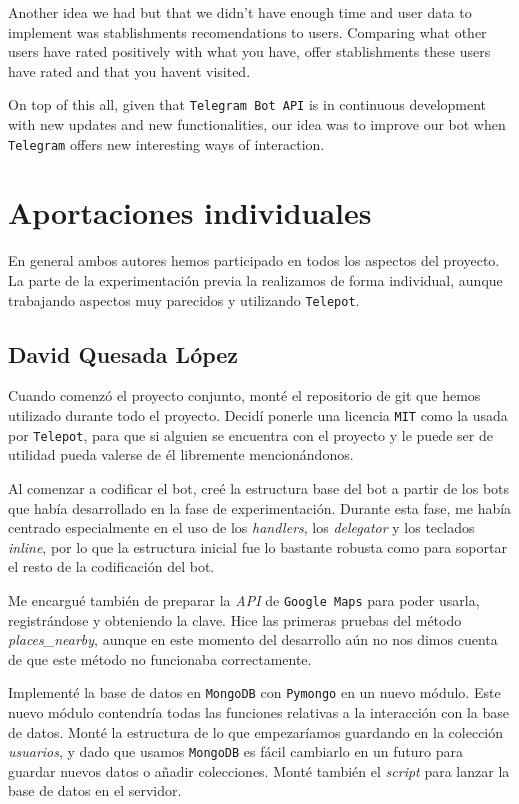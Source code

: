 \documentclass[oneside]{memoir}
\newcommand{\mychapter}[2]{
    \setcounter{chapter}{#1}
    \setcounter{section}{0}
    \chapter*{#2}
    \addcontentsline{toc}{chapter}{#2}
}
\begin{document}
Another idea we had but that we didn't have enough time and user data to implement was stablishments recomendations to users. Comparing what other users have rated positively with what you have, offer stablishments these users have rated and that you havent visited.

On top of this all, given that \texttt{Telegram Bot API} is in continuous development with new updates and new functionalities, our idea was to improve our bot when \texttt{Telegram} offers new interesting ways of interaction.

\setcounter{secnumdepth}{0}%
\newpage
\mychapter{9}{Aportaciones individuales}
En general ambos autores hemos participado en todos los aspectos del proyecto. La parte de la experimentación previa la realizamos de forma individual, aunque trabajando aspectos muy parecidos y utilizando \texttt{Telepot}.

\section{David Quesada L\'opez}
Cuando comenzó el proyecto conjunto, monté el repositorio de git que hemos utilizado durante todo el proyecto. Decidí ponerle una licencia \texttt{MIT} como la usada por \texttt{Telepot}, para que si alguien se encuentra con el proyecto y le puede ser de utilidad pueda valerse de él libremente mencionándonos.

Al comenzar a codificar el bot, creé la estructura base del bot a partir de los bots que había desarrollado en la fase de experimentación. Durante esta fase, me había centrado especialmente en el uso de los \textit{handlers}, los \textit{delegator} y los teclados \textit{inline}, por lo que la estructura inicial fue lo bastante robusta como para soportar el resto de la codificación del bot.

Me encargué también de preparar la \textit{API} de \texttt{Google Maps} para poder usarla, registrándose y obteniendo la clave. Hice las primeras pruebas del método \textit{places\_nearby}, aunque en este momento del desarrollo aún no nos dimos cuenta de que este método no funcionaba correctamente. 

Implementé la base de datos en \texttt{MongoDB} con \texttt{Pymongo} en un nuevo módulo. Este nuevo módulo contendría todas las funciones relativas a la interacción con la base de datos. Monté la estructura de lo que empezaríamos guardando en la colección \textit{usuarios}, y dado que usamos \texttt{MongoDB} es fácil cambiarlo en un futuro para guardar nuevos datos o añadir colecciones. Monté también el \textit{script} para lanzar la base de datos en el servidor. 
\end{document}
